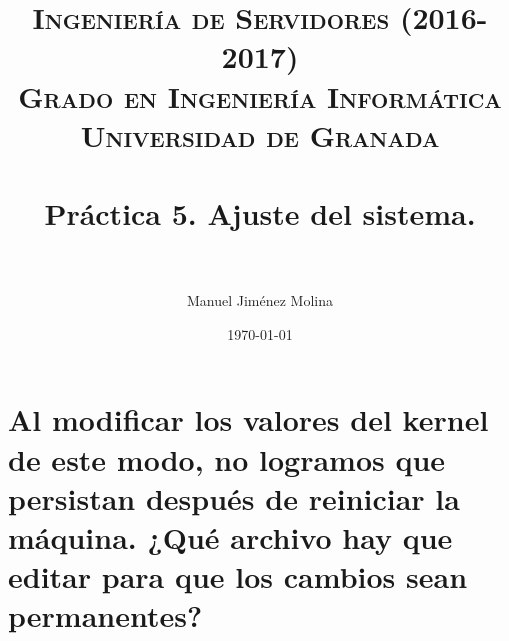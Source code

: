 
\title{	
	\normalfont \normalsize 
	\textsc{{\bf Ingeniería de Servidores (2016-2017)} \\ Grado en Ingeniería Informática \\ Universidad de Granada} \\ [25pt] %
	\horrule{0.5pt} \\[0.4cm] %
	\huge Práctica 5. Ajuste del sistema. \\ %
	\horrule{2pt} \\[0.5cm] %
}

\author{Manuel Jiménez Molina} %

\date{\normalsize\today} %



	
	\maketitle %
	
	\newpage %
	
	\tableofcontents %
	
	\listoffigures
	
	\listoftables
	
	\newpage
	
	
	
	
	
	\newpage
	
	
	\section{Al modificar los valores del kernel de este modo, no logramos que persistan después de reiniciar la máquina. ¿Qué archivo hay que editar para que los cambios sean permanentes?}
	
